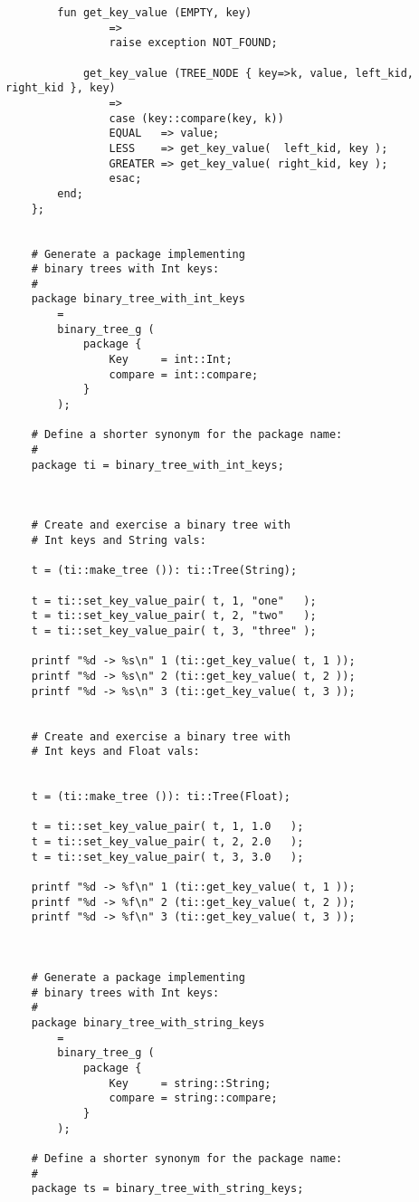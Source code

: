 \begin{verbatim}
        fun get_key_value (EMPTY, key)
                =>
                raise exception NOT_FOUND;

            get_key_value (TREE_NODE { key=>k, value, left_kid, right_kid }, key)
                =>
                case (key::compare(key, k))
                EQUAL   => value;
                LESS    => get_key_value(  left_kid, key );
                GREATER => get_key_value( right_kid, key );
                esac;
        end;
    };


    # Generate a package implementing
    # binary trees with Int keys:
    #
    package binary_tree_with_int_keys
        =
        binary_tree_g (
            package {
                Key     = int::Int;
                compare = int::compare;
            }
        );

    # Define a shorter synonym for the package name:
    #
    package ti = binary_tree_with_int_keys;



    # Create and exercise a binary tree with
    # Int keys and String vals:

    t = (ti::make_tree ()): ti::Tree(String);

    t = ti::set_key_value_pair( t, 1, "one"   );
    t = ti::set_key_value_pair( t, 2, "two"   );
    t = ti::set_key_value_pair( t, 3, "three" );

    printf "%d -> %s\n" 1 (ti::get_key_value( t, 1 ));
    printf "%d -> %s\n" 2 (ti::get_key_value( t, 2 ));
    printf "%d -> %s\n" 3 (ti::get_key_value( t, 3 ));


    # Create and exercise a binary tree with
    # Int keys and Float vals:


    t = (ti::make_tree ()): ti::Tree(Float);

    t = ti::set_key_value_pair( t, 1, 1.0   );
    t = ti::set_key_value_pair( t, 2, 2.0   );
    t = ti::set_key_value_pair( t, 3, 3.0   );

    printf "%d -> %f\n" 1 (ti::get_key_value( t, 1 ));
    printf "%d -> %f\n" 2 (ti::get_key_value( t, 2 ));
    printf "%d -> %f\n" 3 (ti::get_key_value( t, 3 ));



    # Generate a package implementing
    # binary trees with Int keys:
    #
    package binary_tree_with_string_keys
        =
        binary_tree_g (
            package {
                Key     = string::String;
                compare = string::compare;
            }
        );

    # Define a shorter synonym for the package name:
    #
    package ts = binary_tree_with_string_keys;







\end{verbatim}
